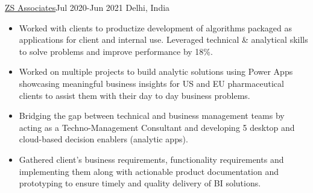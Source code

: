 \documentclass[10pt,a4paper,ragged2e]{altacv}
\begin{document}
 {\color{mecol}\href{https://www.zs.com/}{ZS Associates}}{Jul 2020-Jun 2021 }{Delhi, India}
\begin{itemize}

\item { Worked with clients to productize development of algorithms packaged as applications for client and internal use. Leveraged technical \& analytical skills to solve problems and improve performance by 18\%.}
\item {Worked on multiple projects to build analytic solutions using Power Apps showcasing meaningful business insights for US and EU pharmaceutical clients to assist them with their day to day business problems. }
\item {Bridging the gap between technical and business management teams by acting as a Techno-Management Consultant and developing 5 desktop and cloud-based decision enablers (analytic apps).}
\item {	Gathered client’s business requirements, functionality requirements and implementing them along with actionable product documentation and prototyping to ensure timely and quality delivery of BI solutions. }




\end{itemize}
\divider
\end{document}

